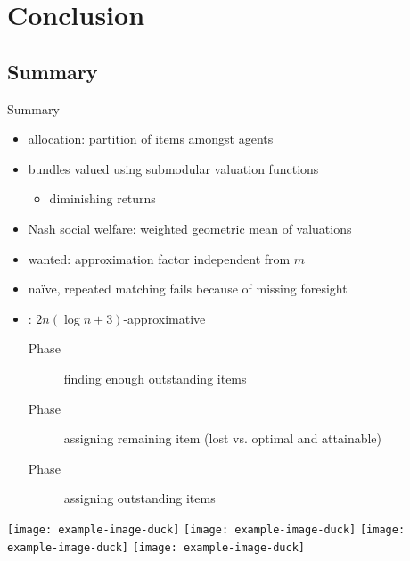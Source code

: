 \section{Conclusion}

\subsection{Summary}
\begin{frame}{Summary}
	\begin{itemize}
		\item
		allocation:
		partition of items amongst agents

		\item
		bundles valued using submodular valuation functions
		\begin{itemize}
			\item
			diminishing returns
		\end{itemize}

		\item
		Nash social welfare:
		weighted geometric mean of valuations

		\item
		wanted: approximation factor independent from \(m\)

		\item
		naïve, repeated matching fails because of missing foresight

		\item
		\RepReMatch:
		\(2n (\log n + 3)\)-approximative
		\begin{description}
			\item[Phase \phasei]
			finding enough outstanding items

			\item[Phase \phaseii]
			assigning remaining item (lost vs. optimal and attainable)

			\item[Phase \phaseiii]
			assigning outstanding items
		\end{description}
	\end{itemize}
	\begin{center}
		\texttt{[image: example-image-duck]}
		\hfill
		\texttt{[image: example-image-duck]}
		\hfill
		\texttt{[image: example-image-duck]}
		\hfill
		\texttt{[image: example-image-duck]}
	\end{center}
\end{frame}





